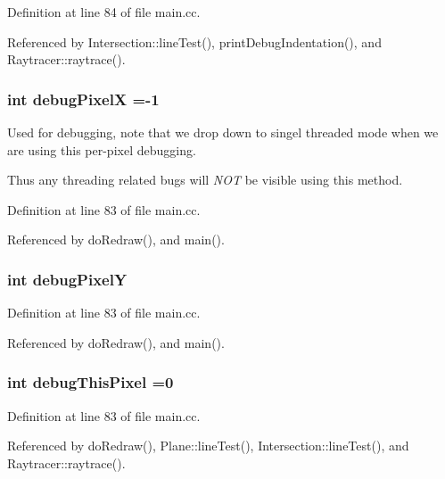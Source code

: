 Definition at line 84 of file main.\+cc.



Referenced by Intersection\+::line\+Test(), print\+Debug\+Indentation(), and Raytracer\+::raytrace().

\subsubsection[{debug\+Pixel\+X}]{\setlength{\rightskip}{0pt plus 5cm}int debug\+Pixel\+X =-\/1}\label{main_8cc_a66b8012a1683432998c4d93682ed069a}


Used for debugging, note that we drop down to singel threaded mode when we are using this per-\/pixel debugging. 

Thus any threading related bugs will {\itshape N\+O\+T} be visible using this method. 

Definition at line 83 of file main.\+cc.



Referenced by do\+Redraw(), and main().

\subsubsection[{debug\+Pixel\+Y}]{\setlength{\rightskip}{0pt plus 5cm}int debug\+Pixel\+Y}\label{main_8cc_ad6d404111e65b158c54e3b0fa5cc528f}


Definition at line 83 of file main.\+cc.



Referenced by do\+Redraw(), and main().

\subsubsection[{debug\+This\+Pixel}]{\setlength{\rightskip}{0pt plus 5cm}int debug\+This\+Pixel =0}\label{main_8cc_a030f3c150bfe06af45f51ded93eb4d57}


Definition at line 83 of file main.\+cc.



Referenced by do\+Redraw(), Plane\+::line\+Test(), Intersection\+::line\+Test(), and Raytracer\+::raytrace().

